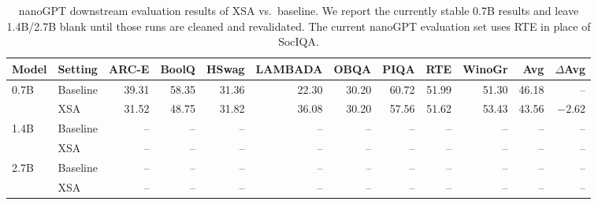 \begin{table}[t]
  \caption{nanoGPT downstream evaluation results of XSA vs.\ baseline.
  We report the currently stable 0.7B results and leave 1.4B/2.7B blank until
  those runs are cleaned and revalidated. The current nanoGPT evaluation set
  uses RTE in place of SocIQA.}
  \label{tab:nanogpt-xsa}
  \centering
  \scriptsize
  \setlength{\tabcolsep}{4pt}
  \begin{tabular}{llrrrrrrrrrr}
    \toprule
    Model & Setting & ARC-E & BoolQ & HSwag & LAMBADA & OBQA & PIQA & RTE & WinoGr & Avg & $\Delta$Avg \\
    \midrule
    \multirow{2}{*}{0.7B}
      & Baseline & 39.31 & 58.35 & 31.36 & 22.30 & 30.20 & 60.72 & 51.99 & 51.30 & 46.18 & -- \\
      & XSA & 31.52 & 48.75 & 31.82 & 36.08 & 30.20 & 57.56 & 51.62 & 53.43 & 43.56 & $-2.62$ \\
    \midrule
    \multirow{2}{*}{1.4B}
      & Baseline & -- & -- & -- & -- & -- & -- & -- & -- & -- & -- \\
      & XSA & -- & -- & -- & -- & -- & -- & -- & -- & -- & -- \\
    \midrule
    \multirow{2}{*}{2.7B}
      & Baseline & -- & -- & -- & -- & -- & -- & -- & -- & -- & -- \\
      & XSA & -- & -- & -- & -- & -- & -- & -- & -- & -- & -- \\
    \bottomrule
  \end{tabular}
\end{table}


